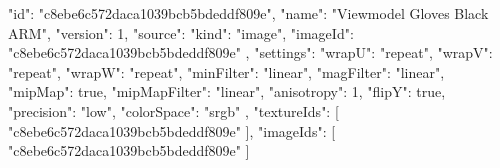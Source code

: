 {
  "id": "c8ebe6c572daca1039bcb5bdeddf809e",
  "name": "Viewmodel Gloves Black ARM",
  "version": 1,
  "source": {
    "kind": "image",
    "imageId": "c8ebe6c572daca1039bcb5bdeddf809e"
  },
  "settings": {
    "wrapU": "repeat",
    "wrapV": "repeat",
    "wrapW": "repeat",
    "minFilter": "linear",
    "magFilter": "linear",
    "mipMap": true,
    "mipMapFilter": "linear",
    "anisotropy": 1,
    "flipY": true,
    "precision": "low",
    "colorSpace": "srgb"
  },
  "textureIds": [
    "c8ebe6c572daca1039bcb5bdeddf809e"
  ],
  "imageIds": [
    "c8ebe6c572daca1039bcb5bdeddf809e"
  ]
}
